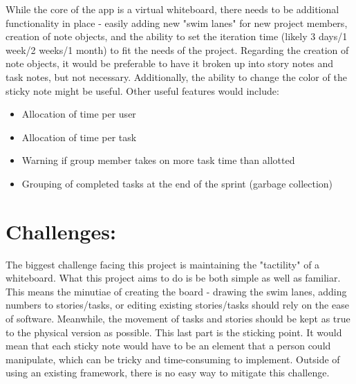 \documentclass[12pt]{article}
\begin{document}
	        While the core of the app is a virtual whiteboard, there needs to be additional functionality in place - easily adding new "swim lanes" for new project members, creation of note objects, and the ability to set the iteration time (likely 3 days/1 week/2 weeks/1 month) to fit the needs of the project. Regarding the creation of note objects, it would be preferable to have it broken up into story notes and task notes, but not necessary. Additionally, the ability to change the color of the sticky note might be useful. Other useful features would include:
	        
	        \begin{itemize}
            \item Allocation of time per user
            \item Allocation of time per task
            \item Warning if group member takes on more task time than allotted
            \item Grouping of completed tasks at the end of the sprint (garbage collection)
          \end{itemize}
	
\section{Challenges:}

	        The biggest challenge facing this project is maintaining the "tactility" of a whiteboard. What this project aims to do is be both simple as well as familiar. This means the minutiae of creating the board - drawing the swim lanes, adding numbers to stories/tasks, or editing existing stories/tasks should rely on the ease of software. Meanwhile, the movement of tasks and stories should be kept as true to the physical version as possible. This last part is the sticking point. It would mean that each sticky note would have to be an element that a person could manipulate, which can be tricky and time-consuming to implement. Outside of using an existing framework, there is no easy way to mitigate this challenge.
\end{document}
